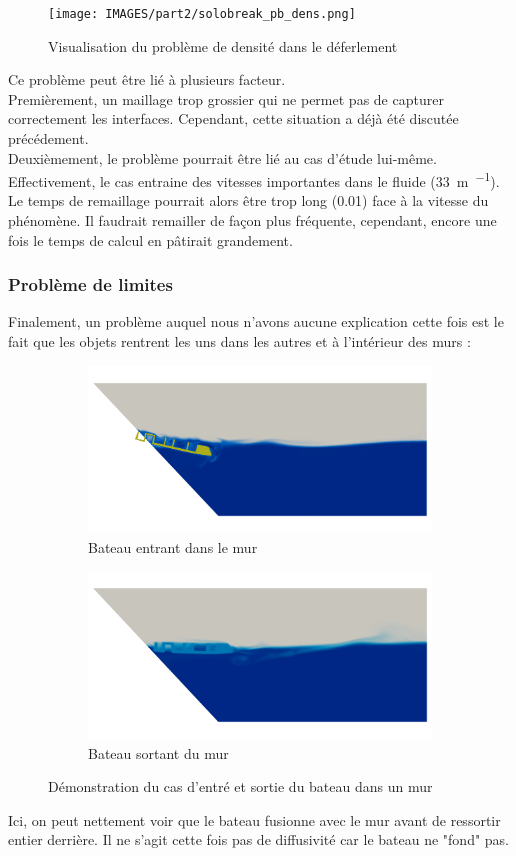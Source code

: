\documentclass[../main.tex]{subfiles}
\begin{document}
\begin{figure}[H]
    \centering
    \texttt{[image: IMAGES/part2/solobreak\_pb\_dens.png]}
    \caption{Visualisation du problème de densité dans le déferlement}
\end{figure}

Ce problème peut être lié à plusieurs facteur.\\
Premièrement, un maillage trop grossier qui ne permet pas de capturer correctement les interfaces. Cependant, cette situation a déjà été discutée précédement.\\
Deuxièmement, le problème pourrait être lié au cas d'étude lui-même. Effectivement, le cas entraine des vitesses importantes dans le fluide (\qty{33}{\meter\per\sec}). Le temps de remaillage pourrait alors être trop long (\qty{0.01}{\sec}) face à la vitesse du phénomène. Il faudrait remailler de façon plus fréquente, cependant, encore une fois le temps de calcul en pâtirait grandement.

\subsubsection*{Problème de limites}
Finalement, un problème auquel nous n'avons aucune explication cette fois est le fait que les objets rentrent les uns dans les autres et à l'intérieur des murs :
\begin{figure}[H]
\centering
\begin{subfigure}[b]{8.4cm}
    \centering
    \includegraphics[width=\linewidth]{IMAGES/part2/zephyr_launching.0089.png}
    \caption{Bateau entrant dans le mur}
\end{subfigure}
\hfill
\begin{subfigure}[b]{8.4cm}
    \centering
    \includegraphics[width=\linewidth]{IMAGES/part2/wall_pb.png}
    \caption{Bateau sortant du mur}
\end{subfigure}
\caption{Démonstration du cas d'entré et sortie du bateau dans un mur}
\end{figure}

Ici, on peut nettement voir que le bateau fusionne avec le mur avant  de ressortir entier derrière. Il ne s'agit cette fois pas de diffusivité car le bateau ne "fond" pas.
\end{document}
